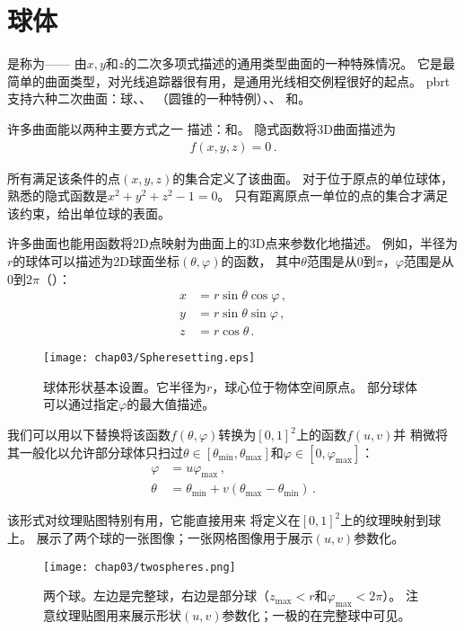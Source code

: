 \section{球体}\label{sec:球体}

是称为——
由$x,y$和$z$的二次多项式描述的通用类型曲面的一种特殊情况。
它是最简单的曲面类型，对光线追踪器很有用，是通用光线相交例程很好的起点。
pbrt支持六种二次曲面：球、、
（圆锥的一种特例）、、
和。

许多曲面能以两种主要方式之一
描述：和。
隐式函数将3D曲面描述为
\begin{align*}
    f(x,y,z)=0\, .
\end{align*}

所有满足该条件的点$(x,y,z)$的集合定义了该曲面。
对于位于原点的单位球体，熟悉的隐式函数是$x^2+y^2+z^2-1=0$。
只有距离原点一单位的点的集合才满足该约束，给出单位球的表面。

许多曲面也能用函数将2D点映射为曲面上的3D点来参数化地描述。
例如，半径为$r$的球体可以描述为2D球面坐标$(\theta,\varphi)$的函数，
其中$\theta$范围是从$0$到$\pi$，$\varphi$范围是从$0$到$2\pi$（）：
\begin{align*}
    x & =r\sin\theta\cos\varphi\, , \\
    y & =r\sin\theta\sin\varphi\, , \\
    z & =r\cos\theta\, .
\end{align*}
\begin{figure}[htbp]
    \centering\texttt{[image: chap03/Spheresetting.eps]}
    \caption{球体形状基本设置。它半径为$r$，球心位于物体空间原点。
        部分球体可以通过指定$\varphi$的最大值描述。}
    \label{fig:3.4}
\end{figure}

我们可以用以下替换将该函数$f(\theta,\varphi)$转换为$[0,1]^2$上的函数$f(u,v)$并
稍微将其一般化以允许部分球体只扫过$\theta\in[\theta_{\min},\theta_{\max}]$和$\varphi\in[0,\varphi_{\max}]$：
\begin{align*}
    \varphi & =u\varphi_{\max}\, ,                              \\
    \theta  & =\theta_{\min}+v(\theta_{\max}-\theta_{\min})\, .
\end{align*}

该形式对纹理贴图特别有用，它能直接用来
将定义在$[0,1]^2$上的纹理映射到球上。
展示了两个球的一张图像；一张网格图像用于展示$(u,v)$参数化。
\begin{figure}[htbp]
    \centering\texttt{[image: chap03/twospheres.png]}
    \caption{两个球。左边是完整球，右边是部分球（$z_{\max}<r$和$\varphi_{\max}<2\pi$）。
        注意纹理贴图用来展示形状$(u,v)$参数化；一极的\protect{}在完整球中可见。}
    \label{fig:3.5}
\end{figure}


